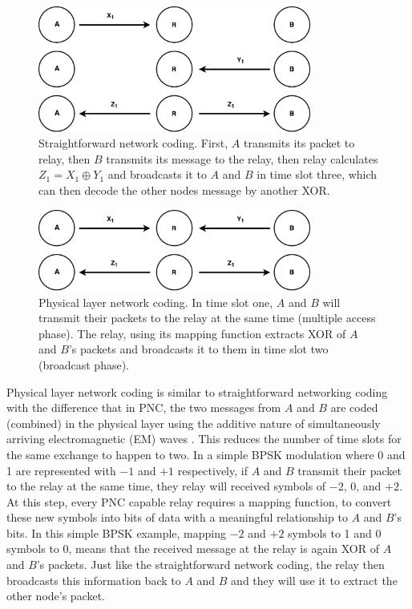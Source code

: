 \begin{figure} 
    \centering
    \includegraphics[width=0.8\textwidth]{figures/straightforwardNC.pdf}
    \caption{Straightforward network coding. First, $A$ transmits its packet to relay, then $B$ transmits its message to the relay, then relay calculates $Z_1=X_1 \oplus Y_1$ and broadcasts it to $A$ and $B$ in time slot three, which can then decode the other nodes message by another XOR.} \label{fig:straightforwardNC}
\end{figure}

\begin{figure}
    \centering
    \includegraphics[width=0.8\textwidth]{figures/threeNodePnc.pdf}
    \caption{Physical layer network coding. In time slot one, $A$ and $B$ will transmit their packets to the relay at the same time (multiple access phase). The relay, using its mapping function extracts XOR of $A$ and $B$'s packets and broadcasts it to them in time slot two (broadcast phase).} \label{fig:threeNodePnc}
\end{figure}

Physical layer network coding is similar to straightforward networking coding with the difference that in PNC, the two messages from $A$ and $B$ are coded (combined) in the physical layer using the additive nature of simultaneously arriving electromagnetic (EM) waves \cite{zhang2006hot}. This reduces the number of time slots for the same exchange to happen to two. In a simple BPSK modulation where 0 and 1 are represented with $-1$ and $+1$ respectively, if $A$ and $B$ transmit their packet to the relay at the same time, they relay will received symbols of $-2$, $0$, and $+2$. At this step, every PNC capable relay requires a mapping function, to convert these new symbols into bits of data with a meaningful relationship to $A$ and $B$'s bits. In this simple BPSK example, mapping $-2$ and $+2$ symbols to 1 and $0$ symbols to 0, means that the received message at the relay is again XOR of $A$ and $B$'s packets. Just like the straightforward network coding, the relay then broadcasts this information back to $A$ and $B$ and they will use it to extract the other node's packet.


